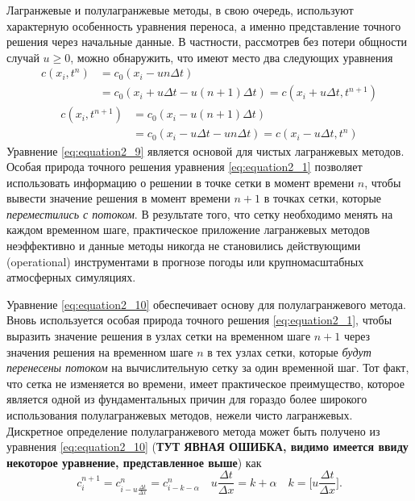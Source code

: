 Лагранжевые и полулагранжевые методы, в свою очередь, используют характерную особенность уравнения переноса, а именно представление точного решения через начальные данные. В частности, рассмотрев без потери общности случай $u\ge0$, можно обнаружить, что имеют место два следующих уравнения
%
\begin{equation}
\label{eq:equation2_8}
\begin{split}
c (x_i, t^n) & = c_0(x_i - un\Delta t) {} \\
		     & {} = c_0(x_i + u\Delta t - u(n+1)\Delta t) = c(x_i + u\Delta t, t^{n+1})
\end{split}
\end{equation}
%
%
\begin{equation}
\label{eq:equation2_9}
\begin{split}
c (x_i, t^{n+1}) & = c_0(x_i - u(n+1)\Delta t) {} \\
& {} = c_0(x_i - u\Delta t - un\Delta t) = c(x_i - u\Delta t, t^{n})
\end{split}
\end{equation}
%
Уравнение \eqref{eq:equation2_9} является основой для чистых лагранжевых методов. Особая природа точного решения уравнения \eqref{eq:equation2_1} позволяет использовать информацию о решении в точке сетки в момент времени $n$, чтобы вывести значение решения в момент времени $n+1$ в точках сетки, которые \textit{переместились с потоком}. В результате того, что сетку необходимо менять на каждом временном шаге, практическое приложение лагранжевых методов неэффективно и данные методы никогда не становились действующими (operational) инструментами в прогнозе погоды или крупномасштабных атмосферных симуляциях.

Уравнение \eqref{eq:equation2_10} обеспечивает основу для полулагранжевого метода. Вновь используется особая природа точного решения \eqref{eq:equation2_1}, чтобы выразить значение решения в узлах сетки на временном шаге $n+1$ через значения решения на временном шаге $n$ в тех узлах сетки, которые \textit{будут перенесены потоком} на вычислительную сетку за один временной шаг.
Тот факт, что сетка не изменяется во времени, имеет практическое преимущество, которое является одной из фундаментальных причин для гораздо более широкого использования полулагранжевых методов, нежели чисто лагранжевых. Дискретное определение полулагранжевого метода может быть получено из уравнения \eqref{eq:equation2_10} (\textbf{ТУТ ЯВНАЯ ОШИБКА, видимо имеется ввиду некоторое уравнение, представленное выше}) как
%
\begin{equation}
\label{eq:equation2_10}
c_i^{n+1} = c_{i-u\frac{\Delta t}{\Delta x}}^{n} = c_{i-k-\alpha}^n \quad u\frac{\Delta t}{\Delta x} = k + \alpha \quad k = \Big[u\frac{\Delta t}{\Delta x}\Big].
\end{equation}
%

